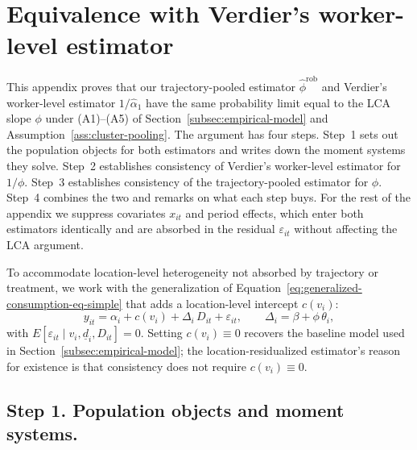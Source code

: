 %

\section{Equivalence with Verdier's worker-level estimator}\label{app:verdier-equivalence}

This appendix proves that our trajectory-pooled estimator $\hat\phi^{\mathrm{rob}}$ and Verdier's worker-level estimator $1/\hat\alpha_1$ have the same probability limit equal to the LCA slope $\phi$ under (A1)--(A5) of Section~\ref{subsec:empirical-model} and Assumption~\ref{ass:cluster-pooling}.
The argument has four steps.
Step~1 sets out the population objects for both estimators and writes down the moment systems they solve.
Step~2 establishes consistency of Verdier's worker-level estimator for $1/\phi$.
Step~3 establishes consistency of the trajectory-pooled estimator for $\phi$.
Step~4 combines the two and remarks on what each step buys.
For the rest of the appendix we suppress covariates $x_{it}$ and period effects, which enter both estimators identically and are absorbed in the residual $\varepsilon_{it}$ without affecting the LCA argument.

To accommodate location-level heterogeneity not absorbed by trajectory or treatment, we work with the generalization of Equation~\eqref{eq:generalized-consumption-eq-simple} that adds a location-level intercept $c(v_i)$:
\begin{equation}\label{eq:generalized-with-cluster}
y_{it} = \alpha_i + c(v_i) + \Delta_i\, D_{it} + \varepsilon_{it},
\qquad \Delta_i = \beta + \phi\,\theta_i,
\end{equation}
with $E[\varepsilon_{it}\mid v_i,\underline d_i,D_{it}] = 0$.
Setting $c(v_i) \equiv 0$ recovers the baseline model used in Section~\ref{subsec:empirical-model}; the location-residualized estimator's reason for existence is that consistency does not require $c(v_i) \equiv 0$.

\subsection*{Step 1.  Population objects and moment systems.}

